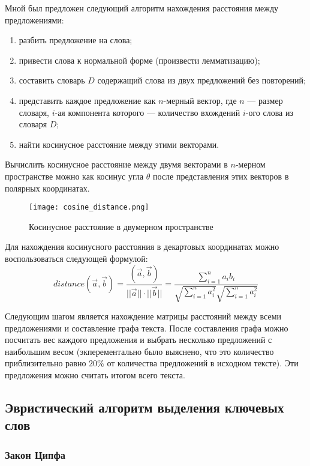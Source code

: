 Мной был предложен следующий алгоритм нахождения расстояния между предложениями:
\begin{enumerate}
    \item разбить предложение на слова;
    \item привести слова к нормальной форме (произвести лемматизацию);
    \item составить словарь $D$ содержащий слова из двух предложений без повторений;
    \item представить каждое предложение как $n$-мерный вектор, где $n$ --- размер словаря, $i$-ая компонента которого --- количество вхождений $i$-ого слова из словаря $D$;
    \item найти косинусное расстояние между этими векторами.
\end{enumerate} 

Вычислить косинусное расстояние между двумя векторами в $n$-мерном пространстве можно как косинус угла $\theta$ после представления этих векторов в полярных координатах.

\begin{figure}[H]
\centering
\texttt{[image: cosine\_distance.png]}
\caption{Косинусное расстояние в двумерном пространстве}
\label{fig:cosine}
\end{figure}

Для нахождения косинусного расстояния в декартовых координатах можно воспользоваться следующей формулой:
\begin{equation}
distance(\vec{a}, \vec{b}) = \dfrac{(\vec{a}, \vec{b})}{||\vec{a}|| \cdot ||\vec{b}||} = \dfrac{\sum\limits_{i=1}^{n}a_i b_i}{\sqrt{\sum\limits_{i=1}^{n} a_i^2}\sqrt{\sum\limits_{i=1}^{n} a_i^2}}
\end{equation}

Следующим шагом является нахождение матрицы расстояний между всеми предложениями и составление графа текста. После составления графа можно посчитать вес каждого предложения и выбрать несколько предложений с наибольшим весом (экперементально было выяснено, что это количество приблизительно равно $20\%$ от количества предложений в исходном тексте). Эти предложения можно считать итогом всего текста.

\subsection{Эвристический алгоритм выделения ключевых слов}

\subsubsection{Закон Ципфа}

